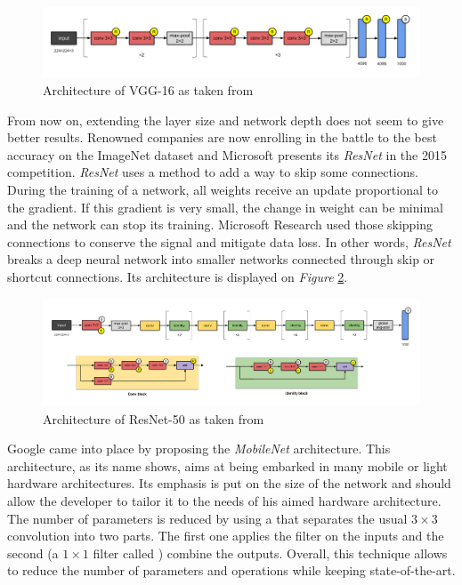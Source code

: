 \begin{figure}[htbp]
	\centering
		\includegraphics[width=14cm]{Figures/VGG-16.png}
	\caption[VGG-16]{Architecture of VGG-16 as taken from \cite{Simonyan2014}}
	\label{fig:VGG-16}
\end{figure}

From now on, extending the layer size and network depth does not seem to give better results. Renowned companies are now enrolling in the battle to the best accuracy on the ImageNet dataset \cite{ImageNet2009} and Microsoft presents its \emph{ResNet} \cite{He2015} in the 2015 competition. \emph{ResNet} uses a method to add a way to skip some connections. During the training of a network, all weights receive an update proportional to the gradient. If this gradient is very small, the change in weight can be minimal and the network can stop its training. Microsoft Research used those skipping connections to conserve the signal and mitigate data loss. In other words, \emph{ResNet} breaks a deep neural network into smaller networks connected through skip or shortcut connections. Its architecture is displayed on \emph{Figure} \ref{fig:ResNet-50}.

\begin{figure}[htbp]
	\centering
		\includegraphics[width=15cm]{Figures/ResNet-50.png}
	\caption[ResNet-50]{Architecture of ResNet-50 as taken from \cite{He2015}}
	\label{fig:ResNet-50}
\end{figure}

Google came into place by proposing the \emph{MobileNet} \cite{Howard2017} architecture. This architecture, as its name shows, aims at being embarked in many mobile or light hardware architectures. Its emphasis is put on the size of the network and should allow the developer to tailor it to the needs of his aimed hardware architecture. The number of parameters is reduced by using a  that separates the usual $3 \times 3$ convolution into two parts. The first one applies the filter on the inputs and the second (a $1 \times 1$ filter called ) combine the outputs. Overall, this technique allows to reduce the number of parameters and operations while keeping state-of-the-art.

